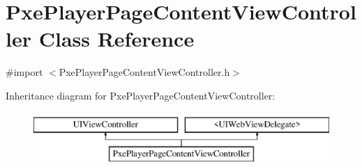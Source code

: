 \hypertarget{interface_pxe_player_page_content_view_controller}{\section{Pxe\-Player\-Page\-Content\-View\-Controller Class Reference}
\label{interface_pxe_player_page_content_view_controller}
}


{\ttfamily \#import $<$Pxe\-Player\-Page\-Content\-View\-Controller.\-h$>$}

Inheritance diagram for Pxe\-Player\-Page\-Content\-View\-Controller\-:\begin{figure}[H]
\begin{center}
\leavevmode
\includegraphics[height=2.000000cm]{interface_pxe_player_page_content_view_controller}
\end{center}
\end{figure}
